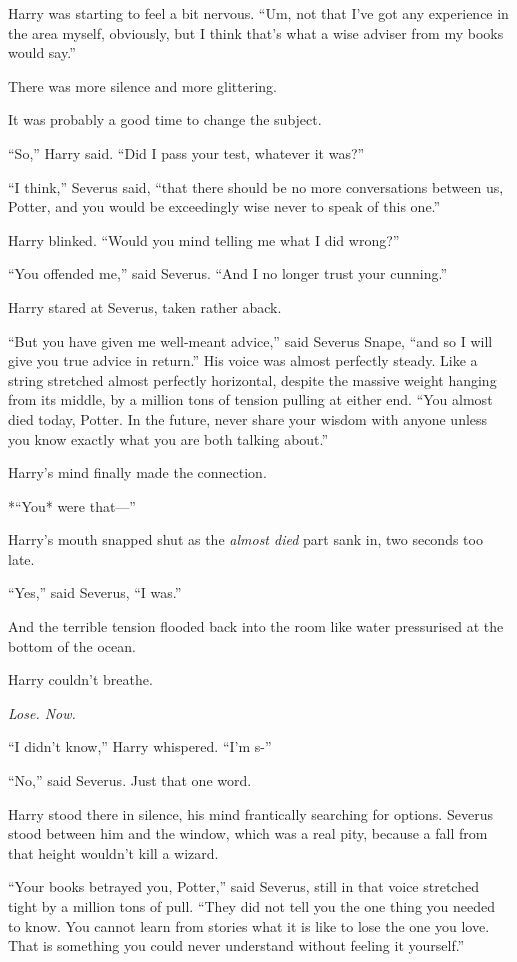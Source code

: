 Harry was starting to feel a bit nervous. ``Um, not that I've got any
experience in the area myself, obviously, but I think that's what a wise
adviser from my books would say.''

There was more silence and more glittering.

It was probably a good time to change the subject.

``So,'' Harry said. ``Did I pass your test, whatever it was?''

``I think,'' Severus said, ``that there should be no more conversations
between us, Potter, and you would be exceedingly wise never to speak of
this one.''

Harry blinked. ``Would you mind telling me what I did wrong?''

``You offended me,'' said Severus. ``And I no longer trust your
cunning.''

Harry stared at Severus, taken rather aback.

``But you have given me well-meant advice,'' said Severus Snape, ``and
so I will give you true advice in return.'' His voice was almost
perfectly steady. Like a string stretched almost perfectly horizontal,
despite the massive weight hanging from its middle, by a million tons of
tension pulling at either end. ``You almost died today, Potter. In the
future, never share your wisdom with anyone unless you know exactly what
you are both talking about.''

Harry's mind finally made the connection.

*``You* were that---''

Harry's mouth snapped shut as the \emph{almost died} part sank in, two
seconds too late.

``Yes,'' said Severus, ``I was.''

And the terrible tension flooded back into the room like water
pressurised at the bottom of the ocean.

Harry couldn't breathe.

\emph{Lose. Now.}

``I didn't know,'' Harry whispered. ``I'm s-''

``No,'' said Severus. Just that one word.

Harry stood there in silence, his mind frantically searching for
options. Severus stood between him and the window, which was a real
pity, because a fall from that height wouldn't kill a wizard.

``Your books betrayed you, Potter,'' said Severus, still in that voice
stretched tight by a million tons of pull. ``They did not tell you the
one thing you needed to know. You cannot learn from stories what it is
like to lose the one you love. That is something you could never
understand without feeling it yourself.''

